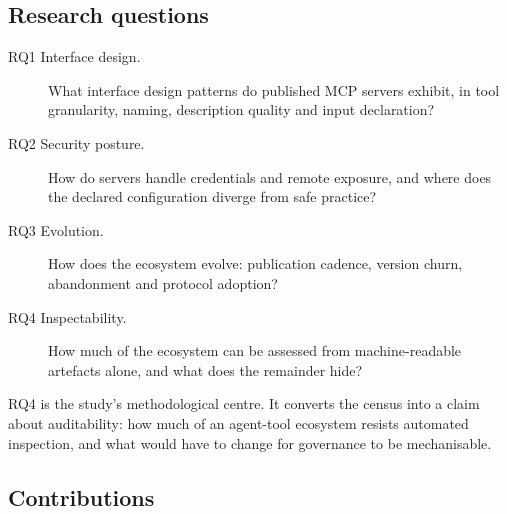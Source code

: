 \documentclass[a4paper,fleqn]{cas-dc}
\begin{document}
\subsection{Research questions}

\begin{description}
\item[RQ1 Interface design.] What interface design patterns do published MCP
servers exhibit, in tool granularity, naming, description quality and input
declaration?
\item[RQ2 Security posture.] How do servers handle credentials and remote
exposure, and where does the declared configuration diverge from safe practice?
\item[RQ3 Evolution.] How does the ecosystem evolve: publication cadence,
version churn, abandonment and protocol adoption?
\item[RQ4 Inspectability.] How much of the ecosystem can be assessed from
machine-readable artefacts alone, and what does the remainder hide?
\end{description}

RQ4 is the study's methodological centre. It converts the census into a claim
about auditability: how much of an agent-tool ecosystem resists automated
inspection, and what would have to change for governance to be mechanisable.

\subsection{Contributions}
\end{document}
